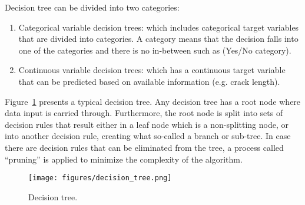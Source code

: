 Decision tree can be divided into two categories:
\begin{enumerate}
	\item Categorical variable decision trees: which includes categorical target variables that are divided into categories. A category means that the decision falls into one of the categories and there is no in-between such as (Yes/No category).
	\item Continuous variable decision trees: which has a continuous target variable that can be predicted based on available information (e.g. crack length).
\end{enumerate}
Figure~\ref{fig:Decision_tree} presents a typical decision tree.
Any decision tree has a root node where data input is carried through.
Furthermore, the root node is split into sets of decision rules that result either in a leaf node which is a non-splitting node, or into another decision rule, creating what so-called a branch or sub-tree.
In case there are decision rules that can be eliminated from the tree, a process called \enquote{pruning} is applied to minimize the complexity of the algorithm.
\begin{figure}[!h]
	\begin{center}
		\texttt{[image: figures/decision\_tree.png]}
	\end{center}
	\caption{Decision tree.}
	\label{fig:Decision_tree}
\end{figure} 
